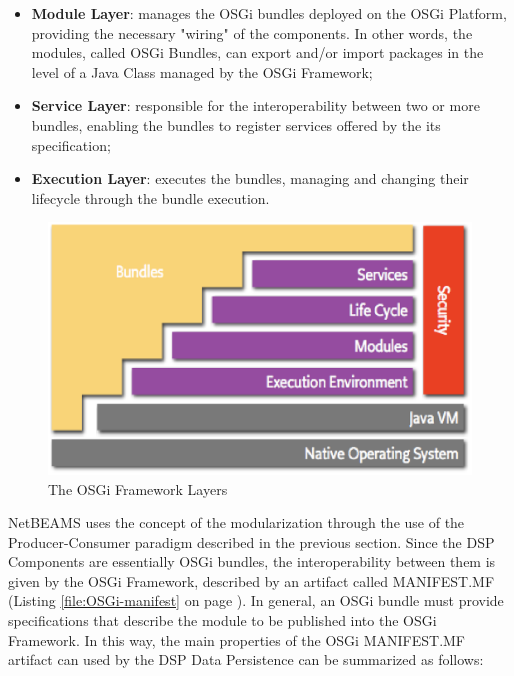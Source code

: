 \begin{itemize}
  \item \textbf{Module Layer}: manages the OSGi bundles deployed on the
  OSGi Platform, providing the necessary "wiring" of the components. In other words,
  the modules, called OSGi Bundles, can export and/or import packages in the
  level of a Java Class managed by the OSGi Framework;
  \item \textbf{Service Layer}: responsible for the interoperability between two
  or more bundles, enabling the bundles to register services offered by
  the its specification;
  \item \textbf{Execution Layer}: executes the bundles, managing and changing
  their lifecycle through the bundle execution.
\end{itemize}

\begin{figure}[!h]
  \centering
  \includegraphics[scale=0.65]{../diagrams/layering-osgi}
  \caption{The OSGi Framework Layers}
  \label{fig:layering-osgi}
\end{figure}

NetBEAMS uses the concept of the modularization through the use of the
Producer-Consumer paradigm described in the previous section. Since the DSP
Components are essentially OSGi bundles, the interoperability between
them is given by the OSGi Framework, described by an artifact called
MANIFEST.MF (Listing \ref{file:OSGi-manifest} on page
\pageref{file:OSGi-manifest}). In general, an OSGi
bundle must provide specifications that describe the module to be published into the OSGi
Framework. In this way, the main properties of the OSGi MANIFEST.MF artifact
can used by the DSP Data Persistence can be summarized as follows:

